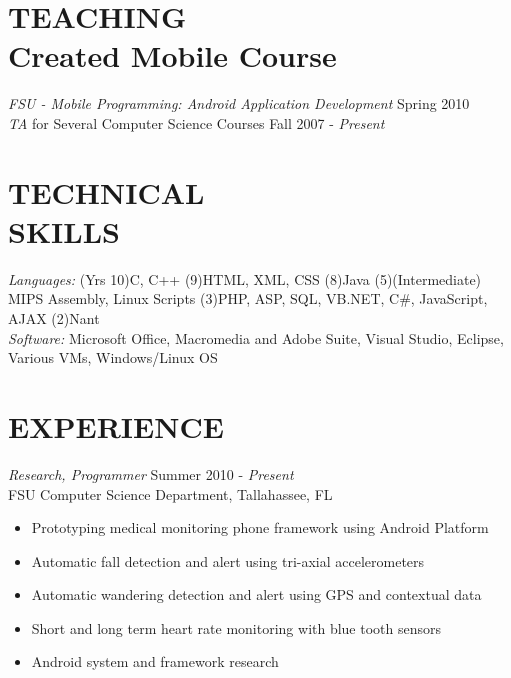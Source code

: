 \documentclass[margin]{res}
\begin{document}
\begin{resume}
\section{TEACHING \\ Created Mobile Course} {\sl FSU - Mobile Programming: Android Application Development} \hfill Spring 2010\\
{\it TA} for Several Computer Science Courses \hfill Fall 2007 - \textit{Present}



\section{TECHNICAL \\ SKILLS} 

{\sl Languages:}
(Yrs 10)C, C++
(9)HTML, XML, CSS
(8)Java
(5)(Intermediate) MIPS Assembly, Linux Scripts
(3)PHP, ASP, SQL, VB.NET, C\#, JavaScript, AJAX
(2)Nant 
\\{\sl Software:}
Microsoft Office, Macromedia and Adobe Suite,
Visual Studio, Eclipse,
Various VMs,
Windows/Linux OS


\section{EXPERIENCE} 


{\sl Research, Programmer} \hfill            Summer 2010 - \textit{Present} \\
FSU Computer Science Department, Tallahassee, FL
\begin{itemize}  \itemsep -2pt %
\item Prototyping medical monitoring phone framework using Android Platform
\item Automatic fall detection and alert using tri-axial accelerometers
\item Automatic wandering detection and alert using GPS and contextual data
\item Short and long term heart rate monitoring with blue tooth sensors
\item Android system and framework research
\end{itemize} 



\end{resume}
\end{document}
